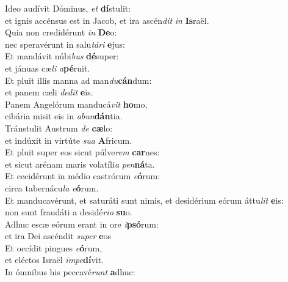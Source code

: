 \oddverse Ideo audívit Dóminus, \textit{et} \textbf{dí}stulit:~\*\\
\oddverse et ignis accénsus est in Jacob, et ira ascén\textit{dit} \textit{in} \textbf{Is}raël.\\
\evenverse Quia non credidérunt \textit{in} \textbf{De}o:~\*\\
\evenverse nec speravérunt in salu\textit{tá}\textit{ri} \textbf{e}jus:\\
\oddverse Et mandávit núbi\textit{bus} \textbf{dé}super:~\*\\
\oddverse et jánuas cæ\textit{li} \textit{a}\textbf{pé}ruit.\\
\evenverse Et pluit illis manna ad man\textit{du}\textbf{cán}dum:~\*\\
\evenverse et panem cæli \textit{de}\textit{dit} \textbf{e}is.\\
\oddverse Panem Angelórum manducá\textit{vit} \textbf{ho}mo,~\*\\
\oddverse cibária misit eis in \textit{a}\textit{bun}\textbf{dán}tia.\\
\evenverse Tránstulit Austrum \textit{de} \textbf{cæ}lo:~\*\\
\evenverse et indúxit in virtúte \textit{su}\textit{a} \textbf{A}fricum.\\
\oddverse Et pluit super eos sicut púlve\textit{rem} \textbf{car}nes:~\*\\
\oddverse et sicut arénam maris volatíli\textit{a} \textit{pen}\textbf{ná}ta.\\
\evenverse Et cecidérunt in médio castrórum \textit{e}\textbf{ó}rum:~\*\\
\evenverse circa tabernácu\textit{la} \textit{e}\textbf{ó}rum.\\
\oddverse Et manducavérunt, et saturáti sunt nimis, et desidérium eórum áttu\textit{lit} \textbf{e}is:~\*\\
\oddverse non sunt fraudáti a desidé\textit{ri}\textit{o} \textbf{su}o.\\
\evenverse Adhuc escæ eórum erant in ore \textit{i}\textbf{psó}rum:~\*\\
\evenverse et ira Dei ascéndit \textit{su}\textit{per} \textbf{e}os\\
\oddverse Et occídit pingues \textit{e}\textbf{ó}rum,~\*\\
\oddverse et eléctos Israël \textit{im}\textit{pe}\textbf{dí}vit.\\
\evenverse In ómnibus his peccavé\textit{runt} \textbf{a}dhuc:~\*\\
